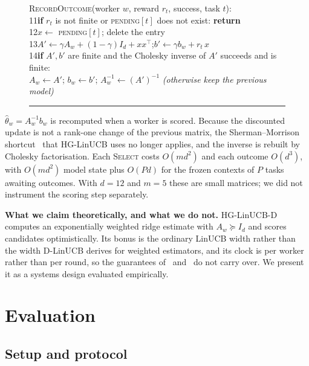 \documentclass[final,5p,times,twocolumn]{elsarticle}
\begin{document}
\begin{figure}[t]
\begin{minipage}{\columnwidth}
\noindent\textsc{RecordOutcome}(worker $w$, reward $r_t$, success, task $t$):\\
\hspace*{0.3em}11\quad \textbf{if} $r_t$ is not finite or \textsc{pending}$[t]$ does not exist: \textbf{return}\\
\hspace*{0.3em}12\quad $x\leftarrow$ \textsc{pending}$[t]$; delete the entry\\
\hspace*{0.3em}13\quad $A'\leftarrow\gamma A_w+(1-\gamma)I_d+xx^\top$;\quad $b'\leftarrow\gamma b_w+r_t\,x$\\
\hspace*{0.3em}14\quad \textbf{if} $A',b'$ are finite and the Cholesky inverse of $A'$ succeeds and is finite:\\
\hspace*{2.2em}$A_w\leftarrow A'$; $b_w\leftarrow b'$; $A_w^{-1}\leftarrow(A')^{-1}$ \textit{(otherwise keep the previous model)}
\vspace{3pt}\hrule
\end{minipage}
\end{figure}

$\hat\theta_w=A_w^{-1}b_w$ is recomputed when a worker is scored. Because the discounted update is not a rank-one change of the previous matrix, the Sherman--Morrison shortcut~\cite{sherman1950} that HG-LinUCB uses no longer applies, and the inverse is rebuilt by Cholesky factorisation. Each \textsc{Select} costs $O(md^2)$ and each outcome $O(d^3)$, with $O(md^2)$ model state plus $O(Pd)$ for the frozen contexts of $P$ tasks awaiting outcomes. With $d=12$ and $m=5$ these are small matrices; we did not instrument the scoring step separately.

\textbf{What we claim theoretically, and what we do not.} HG-LinUCB-D computes an exponentially weighted ridge estimate with $A_w\succeq I_d$ and scores candidates optimistically. Its bonus is the ordinary LinUCB width rather than the width D-LinUCB derives for weighted estimators, and its clock is per worker rather than per round, so the guarantees of~\cite{russac2019} and~\cite{chu2011} do not carry over. We present it as a systems design evaluated empirically.

\section{Evaluation}
\label{sec:eval}

\subsection{Setup and protocol}
\label{sec:setup}
\end{document}
